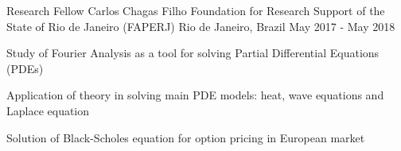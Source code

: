 \begin{cventries}
  \cventry
    {Research Fellow} %
    {Carlos Chagas Filho Foundation for Research Support of the State of Rio de Janeiro (FAPERJ)} %
    {Rio de Janeiro, Brazil} %
    {May 2017 - May 2018} %
    {
      \begin{cvitems} %
        \item {Study of Fourier Analysis as a tool for solving Partial Differential Equations (PDEs)}
        \item {Application of theory in solving main PDE models: heat, wave equations and Laplace equation}
        \item {Solution of Black-Scholes equation for option pricing in European market}
      \end{cvitems}
    }

\end{cventries} 